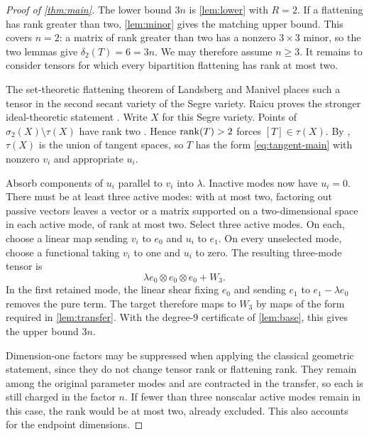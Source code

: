 \begin{proof}[Proof of \cref{thm:main}]
The lower bound $3n$ is \cref{lem:lower} with $R=2$. If a flattening has rank greater than two, \cref{lem:minor} gives the matching upper bound. This covers $n=2$: a matrix of rank greater than two has a nonzero $3\times3$ minor, so the two lemmas give $\delta_2(T)=6=3n$. We may therefore assume $n\ge3$. It remains to consider tensors for which every bipartition flattening has rank at most two.

The set-theoretic flattening theorem of Landsberg and Manivel \cite[arXiv version, Theorem~5.1]{landsbergmanivel} places such a tensor in the second secant variety of the Segre variety. Raicu proves the stronger ideal-theoretic statement \cite[Theorem~4.1 and Corollary~4.2]{raicu}. Write $X$ for this Segre variety. Points of $\sigma_2(X)\setminus\tau(X)$ have rank two \cite[arXiv version, Corollary~1]{ballicobernardi}. Hence $\operatorname{rank}(T)>2$ forces $[T]\in\tau(X)$. By \cite[arXiv version, Notation~1]{ballicobernardi}, $\tau(X)$ is the union of tangent spaces, so $T$ has the form \cref{eq:tangent-main} with nonzero $v_i$ and appropriate $u_i$.

Absorb components of $u_i$ parallel to $v_i$ into $\lambda$. Inactive modes now have $u_i=0$. There must be at least three active modes: with at most two, factoring out passive vectors leaves a vector or a matrix supported on a two-dimensional space in each active mode, of rank at most two. Select three active modes. On each, choose a linear map sending $v_i$ to $e_0$ and $u_i$ to $e_1$. On every unselected mode, choose a functional taking $v_i$ to one and $u_i$ to zero. The resulting three-mode tensor is
\[
                 \lambda e_0\otimes e_0\otimes e_0+W_3.
\]
In the first retained mode, the linear shear fixing $e_0$ and sending $e_1$ to $e_1-\lambda e_0$ removes the pure term. The target therefore maps to $W_3$ by maps of the form required in \cref{lem:transfer}. With the degree-9 certificate of \cref{lem:base}, this gives the upper bound $3n$.

Dimension-one factors may be suppressed when applying the classical geometric statement, since they do not change tensor rank or flattening rank. They remain among the original parameter modes and are contracted in the transfer, so each is still charged in the factor $n$. If fewer than three nonscalar active modes remain in this case, the rank would be at most two, already excluded. This also accounts for the endpoint dimensions.
\end{proof}

